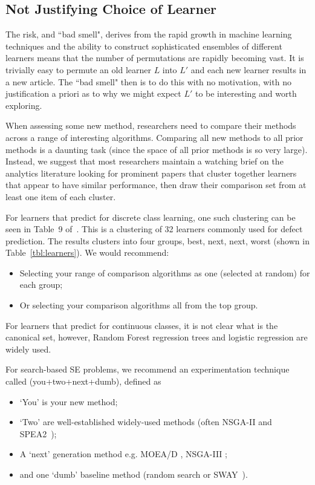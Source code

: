 \documentclass[10pt]{elsarticle}
\newcommand{\RRED}{\color{red}}
\newcommand{\BLACK}{\color{black}}
\begin{document}
 
\subsection{Not Justifying Choice of Learner} \label{tion:learner}

The risk, and ``bad smell", derives from the rapid growth in machine learning techniques and the ability to construct sophisticated ensembles of different learners means that the number of permutations are rapidly becoming vast.  It is trivially easy to permute an old learner $L$ into $L'$ and each new learner results in a new article.  The ``bad smell" then is to do this with no motivation, with no justification a priori as to why we might expect $L'$ to be interesting and worth exploring.

When assessing some new method, researchers need to compare their methods across a range of interesting algorithms.  
\RRED Comparing all new methods to all prior methods is a daunting task (since the space
of all prior methods is so very large). Instead, we suggest that most researchers maintain a watching brief on the analytics literature looking for prominent papers that cluster together learners that appear to have similar performance, then draw their comparison set from at least one item of each cluster.  

For learners that predict for discrete class learning, one such clustering can be seen in \BLACK Table~9 of~\cite{ghotra2015}. This is a clustering of 32 learners commonly used for defect prediction. The results clusters into four groups, best, next, next, worst
(shown in Table~\ref{tbl:learners}). We would recommend:
\begin{itemize}
\item
Selecting your range of comparison algorithms as one (selected at random) for each group;
\item 
Or selecting your comparison algorithms all from the top group.
\end{itemize}

For learners that predict for continuous classes, it is not clear what is the canonical set, however, Random Forest regression trees and logistic regression are widely used. 
 
For search-based SE problems, we recommend an experimentation technique called (you+two+next+dumb), defined as
\begin{itemize}
\item
`You' is your new method;
\item
`Two' are well-established widely-used methods (often NSGA-II and SPEA2~\cite{sayyad2013});
\item A `next' generation method e.g. MOEA/D \cite{zhang2007moea}, NSGA-III \cite{deb14};
\item and one `dumb' baseline method (random search or SWAY~\cite{chen2018}).
\end{itemize}
\end{document}
